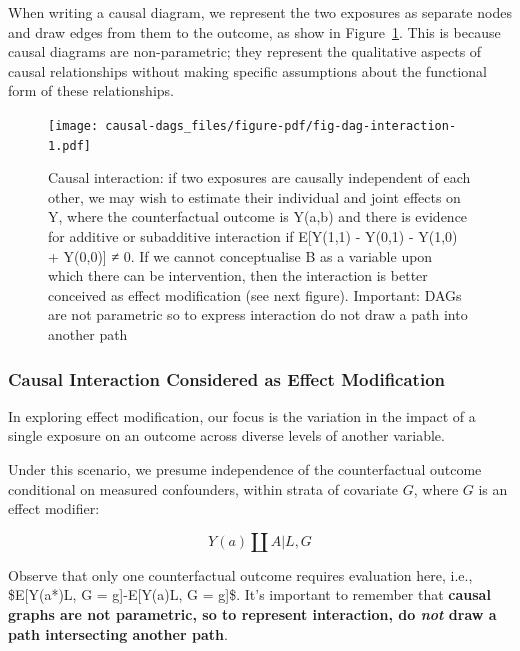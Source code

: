 \documentclass[
  singlecolumn]{report}
\begin{document}
When writing a causal diagram, we represent the two exposures as
separate nodes and draw edges from them to the outcome, as show in
Figure~\ref{fig-dag-interaction}. This is because causal diagrams are
non-parametric; they represent the qualitative aspects of causal
relationships without making specific assumptions about the functional
form of these relationships.

\begin{figure}

{\centering \texttt{[image: causal-dags\_files/figure-pdf/fig-dag-interaction-1.pdf]}

}

\caption{\label{fig-dag-interaction}Causal interaction: if two exposures
are causally independent of each other, we may wish to estimate their
individual and joint effects on Y, where the counterfactual outcome is
Y(a,b) and there is evidence for additive or subadditive interaction if
E{[}Y(1,1) - Y(0,1) - Y(1,0) + Y(0,0){]} ≠ 0. If we cannot conceptualise
B as a variable upon which there can be intervention, then the
interaction is better conceived as effect modification (see next
figure). Important: DAGs are not parametric so to express interaction do
not draw a path into another path}

\end{figure}

\hypertarget{causal-interaction-considered-as-effect-modification}{%
\subsubsection{\texorpdfstring{\textbf{Causal Interaction Considered as
Effect
Modification}}{Causal Interaction Considered as Effect Modification}}\label{causal-interaction-considered-as-effect-modification}}

In exploring effect modification, our focus is the variation in the
impact of a single exposure on an outcome across diverse levels of
another variable.

Under this scenario, we presume independence of the counterfactual
outcome conditional on measured confounders, within strata of covariate
\(G\), where \(G\) is an effect modifier:

\[Y(a) \coprod A | L, G\]

Observe that only one counterfactual outcome requires evaluation here,
i.e., \$E{[}Y(a*)\textbar L, G = g{]}-E{[}Y(a)\textbar L, G = g{]}\$.
It's important to remember that \textbf{causal graphs are not
parametric, so to represent interaction, do \emph{not} draw a path
intersecting another path}.
\end{document}
